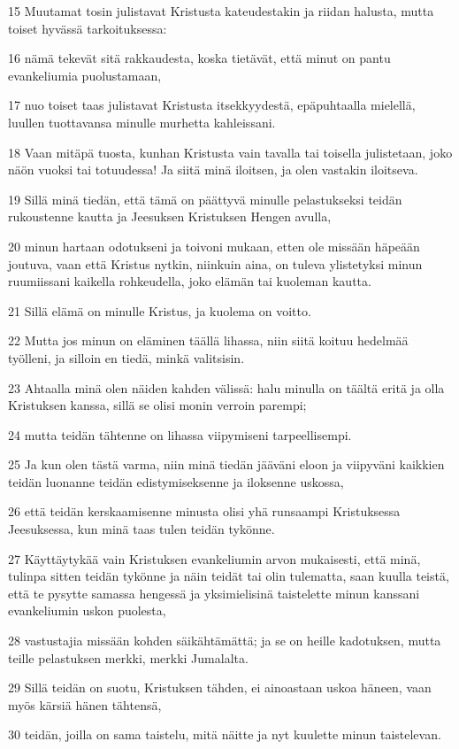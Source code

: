 \par 15 Muutamat tosin julistavat Kristusta kateudestakin ja riidan halusta, mutta toiset hyvässä tarkoituksessa:
\par 16 nämä tekevät sitä rakkaudesta, koska tietävät, että minut on pantu evankeliumia puolustamaan,
\par 17 nuo toiset taas julistavat Kristusta itsekkyydestä, epäpuhtaalla mielellä, luullen tuottavansa minulle murhetta kahleissani.
\par 18 Vaan mitäpä tuosta, kunhan Kristusta vain tavalla tai toisella julistetaan, joko näön vuoksi tai totuudessa! Ja siitä minä iloitsen, ja olen vastakin iloitseva.
\par 19 Sillä minä tiedän, että tämä on päättyvä minulle pelastukseksi teidän rukoustenne kautta ja Jeesuksen Kristuksen Hengen avulla,
\par 20 minun hartaan odotukseni ja toivoni mukaan, etten ole missään häpeään joutuva, vaan että Kristus nytkin, niinkuin aina, on tuleva ylistetyksi minun ruumiissani kaikella rohkeudella, joko elämän tai kuoleman kautta.
\par 21 Sillä elämä on minulle Kristus, ja kuolema on voitto.
\par 22 Mutta jos minun on eläminen täällä lihassa, niin siitä koituu hedelmää työlleni, ja silloin en tiedä, minkä valitsisin.
\par 23 Ahtaalla minä olen näiden kahden välissä: halu minulla on täältä eritä ja olla Kristuksen kanssa, sillä se olisi monin verroin parempi;
\par 24 mutta teidän tähtenne on lihassa viipymiseni tarpeellisempi.
\par 25 Ja kun olen tästä varma, niin minä tiedän jääväni eloon ja viipyväni kaikkien teidän luonanne teidän edistymiseksenne ja iloksenne uskossa,
\par 26 että teidän kerskaamisenne minusta olisi yhä runsaampi Kristuksessa Jeesuksessa, kun minä taas tulen teidän tykönne.
\par 27 Käyttäytykää vain Kristuksen evankeliumin arvon mukaisesti, että minä, tulinpa sitten teidän tykönne ja näin teidät tai olin tulematta, saan kuulla teistä, että te pysytte samassa hengessä ja yksimielisinä taistelette minun kanssani evankeliumin uskon puolesta,
\par 28 vastustajia missään kohden säikähtämättä; ja se on heille kadotuksen, mutta teille pelastuksen merkki, merkki Jumalalta.
\par 29 Sillä teidän on suotu, Kristuksen tähden, ei ainoastaan uskoa häneen, vaan myös kärsiä hänen tähtensä,
\par 30 teidän, joilla on sama taistelu, mitä näitte ja nyt kuulette minun taistelevan.

